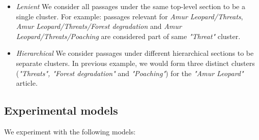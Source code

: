 \begin{itemize}
    \item \textit{Lenient} We consider all passages under the same top-level section to be a single cluster. For example: passages relevant for \textit{Amur Leopard/Threats}, \textit{Amur Leopard/Threats/Forest degradation} and \textit{Amur Leopard/Threats/Poaching} are considered part of same \textit{"Threat"} cluster.
    \item \textit{Hierarchical} We consider passages under different hierarchical sections to be separate clusters. In previous example, we would form three distinct clusters (\textit{"Threats", "Forest degradation"} and \textit{"Poaching"}) for the \textit{"Amur Leopard"} article.
\end{itemize}

\subsection{Experimental models} We experiment with the following models:
